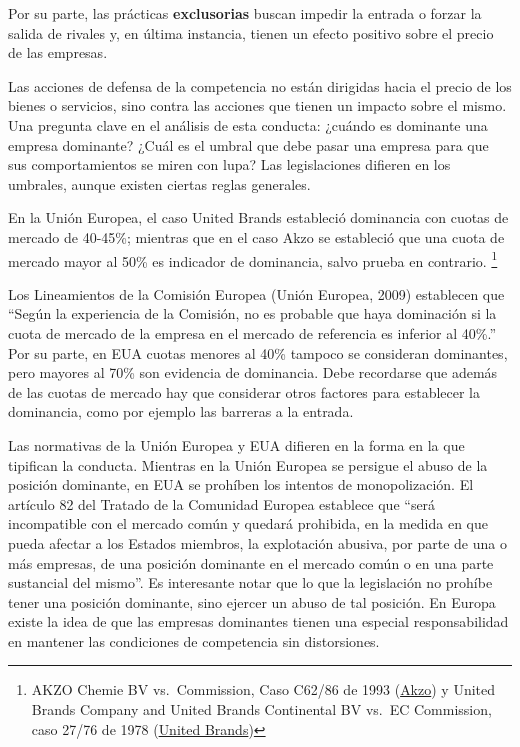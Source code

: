 \documentclass[
  12pt,
  spanish,
]{book}
\begin{document}
Por su parte, las prácticas \textbf{exclusorias} buscan impedir la
entrada o forzar la salida de rivales y, en última instancia, tienen un
efecto positivo sobre el precio de las empresas.

Las acciones de defensa de la competencia no están dirigidas hacia el
precio de los bienes o servicios, sino contra las acciones que tienen un
impacto sobre el mismo. Una pregunta clave en el análisis de esta
conducta: ¿cuándo es dominante una empresa dominante? ¿Cuál es el umbral
que debe pasar una empresa para que sus comportamientos se miren con
lupa? Las legislaciones difieren en los umbrales, aunque existen ciertas
reglas generales.

En la Unión Europea, el caso United Brands estableció dominancia con
cuotas de mercado de 40-45\%; mientras que en el caso Akzo se estableció
que una cuota de mercado mayor al 50\% es indicador de dominancia, salvo
prueba en contrario. \footnote{AKZO Chemie BV vs.~Commission, Caso
  C62/86 de 1993
  (\href{https://eur-lex.europa.eu/resource.html?uri=cellar:4905ac67-5a02-44a0-ae93-7724be6073b0.0008.02/DOC_1\&format=PDF}{Akzo})
  y United Brands Company and United Brands Continental BV vs.~EC
  Commission, caso 27/76 de 1978
  (\href{https://eur-lex.europa.eu/legal-content/ES/TXT/PDF/?uri=CELEX:61976CJ0027\&from=EN}{United
  Brands})}

Los Lineamientos de la Comisión Europea (Unión Europea, 2009) establecen
que ``Según la experiencia de la Comisión, no es probable que haya
dominación si la cuota de mercado de la empresa en el mercado de
referencia es inferior al 40\%.'' Por su parte, en EUA cuotas menores al
40\% tampoco se consideran dominantes, pero mayores al 70\% son
evidencia de dominancia. Debe recordarse que además de las cuotas de
mercado hay que considerar otros factores para establecer la dominancia,
como por ejemplo las barreras a la entrada.

Las normativas de la Unión Europea y EUA difieren en la forma en la que
tipifican la conducta. Mientras en la Unión Europea se persigue el abuso
de la posición dominante, en EUA se prohíben los intentos de
monopolización. El artículo 82 del Tratado de la Comunidad Europea
establece que ``será incompatible con el mercado común y quedará
prohibida, en la medida en que pueda afectar a los Estados miembros, la
explotación abusiva, por parte de una o más empresas, de una posición
dominante en el mercado común o en una parte sustancial del mismo''. Es
interesante notar que lo que la legislación no prohíbe tener una
posición dominante, sino ejercer un abuso de tal posición. En Europa
existe la idea de que las empresas dominantes tienen una especial
responsabilidad en mantener las condiciones de competencia sin
distorsiones.
\end{document}
